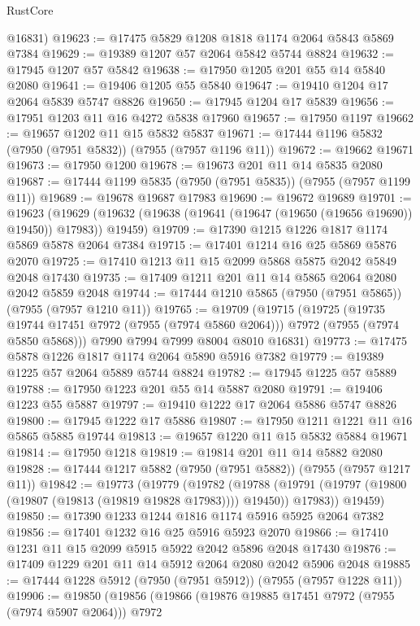 \begin{lexlean}{RustCore}
\begin{coremodule}
      @16831)
@19623 := @17475 @5829 @1208 @1818 @1174 @2064 @5843 @5869 @7384
@19629 := @19389 @1207 @57 @2064 @5842 @5744 @8824
@19632 := @17945 @1207 @57 @5842
@19638 := @17950 @1205 @201 @55 @14 @5840 @2080
@19641 := @19406 @1205 @55 @5840
@19647 := @19410 @1204 @17 @2064 @5839 @5747 @8826
@19650 := @17945 @1204 @17 @5839
@19656 := @17951 @1203 @11 @16 @4272 @5838 @17960
@19657 := @17950 @1197
@19662 := @19657 @1202 @11 @15 @5832 @5837
@19671 := @17444 @1196 @5832 (@7950 (@7951 @5832)) (@7955 (@7957 @1196 @11))
@19672 := @19662 @19671
@19673 := @17950 @1200
@19678 := @19673 @201 @11 @14 @5835 @2080
@19687 := @17444 @1199 @5835 (@7950 (@7951 @5835)) (@7955 (@7957 @1199 @11))
@19689 := @19678 @19687 @17983
@19690 := @19672 @19689
@19701 := @19623
    (@19629 (@19632 (@19638 (@19641 (@19647 (@19650 (@19656 @19690)) @19450)) @17983)) @19459)
@19709 := @17390 @1215 @1226 @1817 @1174 @5869 @5878 @2064 @7384
@19715 := @17401 @1214 @16 @25 @5869 @5876 @2070
@19725 := @17410 @1213 @11 @15 @2099 @5868 @5875 @2042 @5849 @2048 @17430
@19735 := @17409 @1211 @201 @11 @14 @5865 @2064 @2080 @2042 @5859 @2048
@19744 := @17444 @1210 @5865 (@7950 (@7951 @5865)) (@7955 (@7957 @1210 @11))
@19765 := @19709
    (@19715
      (@19725
        (@19735 @19744 @17451 @7972 (@7955 (@7974 @5860 @2064)))
        @7972
        (@7955 (@7974 @5850 @5868)))
      @7990
      @7994
      @7999
      @8004
      @8010
      @16831)
@19773 := @17475 @5878 @1226 @1817 @1174 @2064 @5890 @5916 @7382
@19779 := @19389 @1225 @57 @2064 @5889 @5744 @8824
@19782 := @17945 @1225 @57 @5889
@19788 := @17950 @1223 @201 @55 @14 @5887 @2080
@19791 := @19406 @1223 @55 @5887
@19797 := @19410 @1222 @17 @2064 @5886 @5747 @8826
@19800 := @17945 @1222 @17 @5886
@19807 := @17950 @1211 @1221 @11 @16 @5865 @5885 @19744
@19813 := @19657 @1220 @11 @15 @5832 @5884 @19671
@19814 := @17950 @1218
@19819 := @19814 @201 @11 @14 @5882 @2080
@19828 := @17444 @1217 @5882 (@7950 (@7951 @5882)) (@7955 (@7957 @1217 @11))
@19842 := @19773
    (@19779
      (@19782
        (@19788 (@19791 (@19797 (@19800 (@19807 (@19813 (@19819 @19828 @17983)))) @19450)) @17983))
      @19459)
@19850 := @17390 @1233 @1244 @1816 @1174 @5916 @5925 @2064 @7382
@19856 := @17401 @1232 @16 @25 @5916 @5923 @2070
@19866 := @17410 @1231 @11 @15 @2099 @5915 @5922 @2042 @5896 @2048 @17430
@19876 := @17409 @1229 @201 @11 @14 @5912 @2064 @2080 @2042 @5906 @2048
@19885 := @17444 @1228 @5912 (@7950 (@7951 @5912)) (@7955 (@7957 @1228 @11))
@19906 := @19850
    (@19856
      (@19866
        (@19876 @19885 @17451 @7972 (@7955 (@7974 @5907 @2064)))
        @7972

\end{coremodule}
\end{lexlean}
